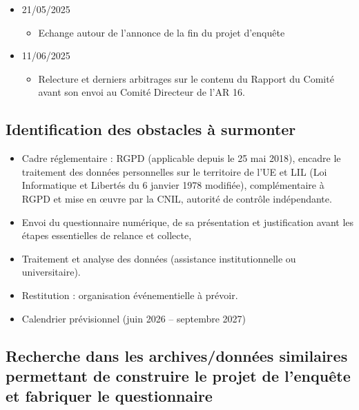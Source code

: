 \documentclass[10pt,a4paper]{article}
\begin{document}
\begin{itemize}
\begin{itemize}
\item Partage d'une analyse de l'annuaire de l'Union-IHEDN 2022 consacrée au vivier des auditeurs et aux limites du potentiel réellement mobilisable en cas de crise majeure.
\item Le rapport a été approfondi et le positionnement de l'AR 16 y est désormais davantage clarifié comme acteur de contribution indirecte mais stratégique, principalement en amont et en aval des crises, autour des enjeux de préparation, de culture stratégique, d'analyse et de retour d'expérience.
\end{itemize}
\item 21/05/2025
\begin{itemize}
\item Echange autour de l'annonce de la fin du projet d'enquête
\end{itemize}
\item 11/06/2025
\begin{itemize}
\item Relecture et derniers arbitrages sur le contenu du Rapport du Comité avant son envoi au Comité Directeur de l'AR 16.
\end{itemize}
\end{itemize}
\subsection{Identification des obstacles à surmonter}
\begin{itemize}
\item Cadre réglementaire : RGPD (applicable depuis le 25 mai 2018), encadre le traitement des données personnelles sur le territoire de l'UE et LIL (Loi Informatique et Libertés du 6 janvier 1978 modifiée), complémentaire à RGPD et mise en œuvre par la CNIL, autorité de contrôle indépendante.
\item Envoi du questionnaire numérique, de sa présentation et justification avant les étapes essentielles de relance et collecte, 
\item Traitement et analyse des données (assistance institutionnelle ou universitaire).
\item Restitution : organisation événementielle à prévoir.
\item Calendrier prévisionnel (juin 2026 -- septembre 2027)
\end{itemize}
\subsection{Recherche dans les archives/données similaires permettant de construire le projet de l'enquête et fabriquer le questionnaire}
\end{document}
